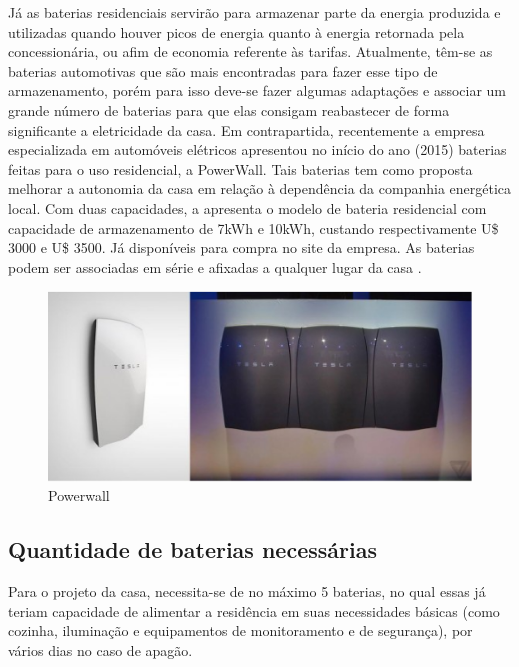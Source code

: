 	Já as baterias residenciais servirão para armazenar parte da energia produzida e utilizadas quando houver picos de energia quanto à energia retornada pela concessionária, ou afim de economia referente às tarifas. Atualmente, têm-se as baterias automotivas que são mais encontradas para fazer esse tipo de armazenamento, porém para isso deve-se fazer algumas adaptações e associar um grande número de baterias para que elas consigam reabastecer de forma significante a eletricidade da casa. Em contrapartida, recentemente a empresa especializada em automóveis elétricos \cite{TESLA} apresentou no início do ano (2015) baterias feitas para o uso residencial, a PowerWall. Tais baterias tem como proposta melhorar a autonomia da casa em relação à dependência da companhia energética local. Com duas capacidades, a \cite{TESLA} apresenta o modelo de bateria residencial com capacidade de armazenamento de 7kWh e 10kWh, custando respectivamente U\$ 3000 e U\$ 3500. Já disponíveis para compra no site da empresa. As baterias podem ser associadas em série e afixadas a qualquer lugar da casa \cite{TESLA}.

\begin{figure}[H]
  \begin{center}
	\includegraphics[keepaspectratio,scale=1]{figuras/powerwall.eps}
	\caption{Powerwall}
  \end{center}
\end{figure}

\subsection{Quantidade de baterias necessárias}

	Para o projeto da casa, necessita-se de no máximo 5 baterias, no qual essas já teriam capacidade de alimentar a residência em suas necessidades básicas (como cozinha, iluminação e equipamentos de monitoramento e de segurança), por vários dias no caso de apagão.

